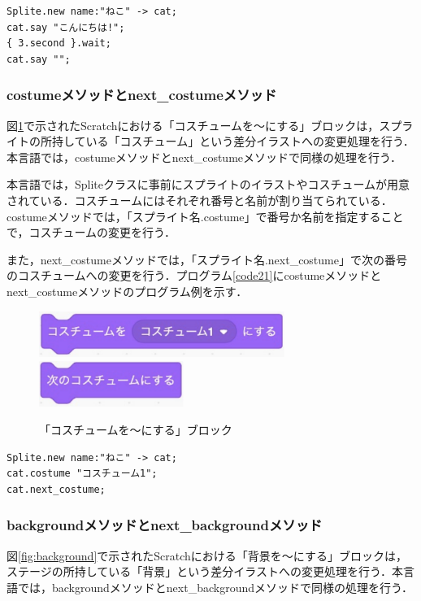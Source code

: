 \documentclass[10pt,a4j]{ltjsarticle}
\begin{document}
\begin{lstlisting}[caption=sayメソッドのプログラム例, label=code20]
Splite.new name:"ねこ" -> cat;
cat.say "こんにちは!";
{ 3.second }.wait;
cat.say "";
\end{lstlisting}

\subsubsection{costumeメソッドとnext\_costumeメソッド}
図\ref{fig:costume}で示されたScratchにおける「コスチュームを〜にする」ブロックは，スプライトの所持している「コスチューム」という差分イラストへの変更処理を行う．本言語では，costumeメソッドとnext\_costumeメソッドで同様の処理を行う．

本言語では，Spliteクラスに事前にスプライトのイラストやコスチュームが用意されている．コスチュームにはそれぞれ番号と名前が割り当てられている．costumeメソッドでは，「スプライト名.costume」で番号か名前を指定することで，コスチュームの変更を行う．

また，next\_costumeメソッドでは，「スプライト名.next\_costume」で次の番号のコスチュームへの変更を行う．プログラム\ref{code21}にcostumeメソッドとnext\_costumeメソッドのプログラム例を示す．

\begin{figure}[H]
  \centering
  \includegraphics[height=15mm]{images/wear.pdf} \\
  \includegraphics[height=15mm]{images/next_wear.pdf} 
  \caption{「コスチュームを〜にする」ブロック}
  \label{fig:costume}
\end{figure}

\begin{lstlisting}[caption=costumeメソッドとnext\_costumeメソッドのプログラム例, label=code21]
Splite.new name:"ねこ" -> cat;
cat.costume "コスチューム1";
cat.next_costume;
\end{lstlisting}

\subsubsection{backgroundメソッドとnext\_backgroundメソッド}
図\ref{fig:background}で示されたScratchにおける「背景を〜にする」ブロックは，ステージの所持している「背景」という差分イラストへの変更処理を行う．本言語では，backgroundメソッドとnext\_backgroundメソッドで同様の処理を行う．
\end{document}
